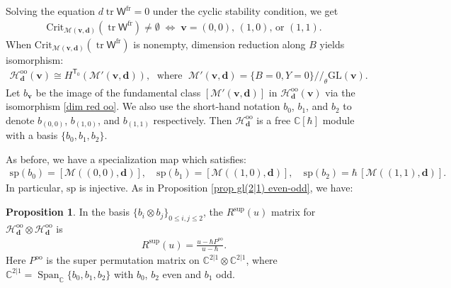 \documentclass[10pt]{amsart}
\theoremstyle{definition}
\newtheorem{Proposition}[Theorem]{Proposition}
\numberwithin{equation}{section}
\newcommand{\GL}{\mathrm{GL}}
\newcommand{\Crit}{\mathrm{Crit}}
\newcommand{\bC}{\mathbb{C}}
\newcommand{\bv}{\mathbf{v}}
\newcommand{\bd}{\mathbf{d}}
\newcommand{\cH}{\mathcal{H}}
\newcommand{\cM}{\mathcal{M}}
\newcommand{\sT}{\mathsf{T}}
\newcommand{\sW}{\mathsf{W}}
\newcommand{\Span}{\operatorname{Span}}
\newcommand{\tr}{\operatorname{tr}}
\begin{document}
Solving the equation $d\tr\sW^{\mathrm{fr}}=0$ under the cyclic stability condition, we get
\begin{align*}
\Crit_{\cM(\bv,\bd)}(\tr\sW^{\mathrm{fr}})\neq \emptyset \;\Longleftrightarrow\; \text{$\bv=(0,0)$, $(1,0)$, or $(1,1)$}.
\end{align*}
When $\Crit_{\cM(\bv,\bd)}(\tr\sW^{\mathrm{fr}})$ is nonempty, dimension reduction along $B$ yields isomorphism:
\begin{align}\label{dim red oo}
\cH^{\mathrm{oo}}_{\bd}(\bv)\cong H^{\sT_0}(\cM'(\bv,\bd)),\;\text{ where }\; \cM'(\bv,\bd)=\{B=0,Y=0\}/\!\!/_\theta\GL(\bv).
\end{align}
Let $b_{\bv}$ be the image of the fundamental class $[\cM'(\bv,\bd)]$ in $\cH^{\mathrm{oo}}_{\bd}(\bv)$ via the isomorphism \eqref{dim red oo}. We also use the short-hand notation $b_{0}$, $b_{1}$, and $b_{2}$ to denote $b_{(0,0)}$, $b_{(1,0)}$, and $b_{(1,1)}$ respectively. Then $\cH^{\mathrm{oo}}_{\bd}$ is a free $\bC[\hbar]$ module with a basis $\{b_0,b_1,b_2\}$.

As before, we have a specialization map which satisfies: 
\begin{align*}
\mathrm{sp}(b_0)=[\cM((0,0),\bd)],\quad \mathrm{sp}(b_1)=[\cM((1,0),\bd)],\quad \mathrm{sp}(b_2)=\hbar\,[\cM((1,1),\bd)].
\end{align*}
In particular, $\mathrm{sp}$ is injective.
As in Proposition \ref{prop gl(2|1) even-odd}, we have:
\begin{Proposition}\label{prop gl(2|1) odd-odd}
In the basis $\{b_i\otimes b_j\}_{0\leqslant i,j\leqslant 2}$, the $R^{\mathrm{sup}}(u)$ matrix for $\cH^{\mathrm{oo}}_{\bd}\otimes \cH^{\mathrm{oo}}_{\bd}$ is
\begin{align*}
R^{\mathrm{sup}}(u)=\frac{u-\hbar P^{\mathrm{oo}}}{u-\hbar}.
\end{align*}
Here $P^{\mathrm{oo}}$ is the super permutation matrix on $\bC^{2|1}\otimes \bC^{2|1}$, where $\bC^{2|1}=\Span_\bC\{b_0,b_1,b_2\}$ with $b_0$, $b_2$ even and $b_1$ odd.
\end{Proposition}

\end{document}
